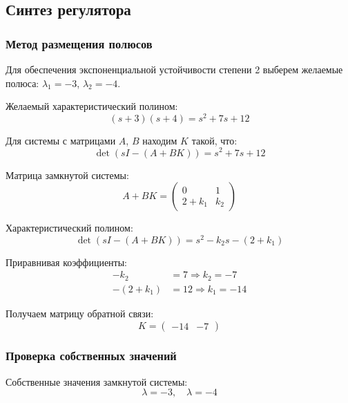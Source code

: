 \subsection*{Синтез регулятора}

\subsubsection*{Метод размещения полюсов}

Для обеспечения экспоненциальной устойчивости степени 2 выберем желаемые полюса: $\lambda_1 = -3$, $\lambda_2 = -4$.

Желаемый характеристический полином:
\begin{equation}
(s + 3)(s + 4) = s^2 + 7s + 12
\end{equation}

Для системы с матрицами $A$, $B$ находим $K$ такой, что:
\begin{equation}
\det(sI - (A + BK)) = s^2 + 7s + 12
\end{equation}

Матрица замкнутой системы:
\begin{equation}
A + BK = \begin{pmatrix} 0 & 1 \\ 2 + k_1 & k_2 \end{pmatrix}
\end{equation}

Характеристический полином:
\begin{equation}
\det(sI - (A + BK)) = s^2 - k_2s - (2 + k_1)
\end{equation}

Приравнивая коэффициенты:
\begin{align}
-k_2 &= 7 \Rightarrow k_2 = -7 \\
-(2 + k_1) &= 12 \Rightarrow k_1 = -14
\end{align}

Получаем матрицу обратной связи:
\begin{equation}
K = \begin{pmatrix} -14 & -7 \end{pmatrix}
\end{equation}

\subsubsection*{Проверка собственных значений}

Собственные значения замкнутой системы:
\begin{equation}
\lambda = -3, \quad \lambda = -4
\end{equation}

